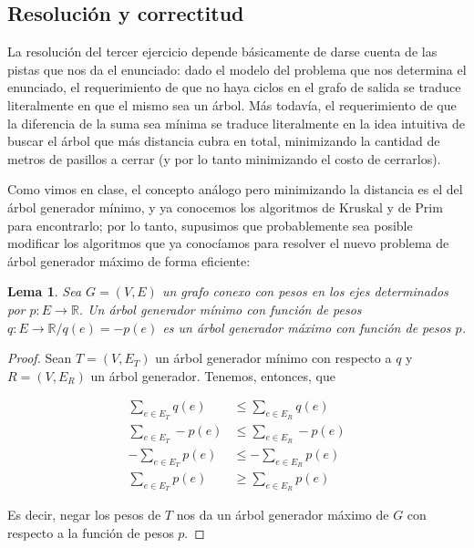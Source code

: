 \documentclass{article}
\newtheorem{lemma}{Lema}[theorem]
\theoremstyle{definition}
\theoremstyle{remark}
\begin{document}
\subsection{Resolución y correctitud}

La resolución del tercer ejercicio depende básicamente de darse cuenta de las pistas que nos da el enunciado: dado el modelo del problema que nos determina el enunciado, el requerimiento de que no haya ciclos en el grafo de salida se traduce literalmente en que el mismo sea un árbol. Más todavía, el requerimiento de que la diferencia de la suma sea mínima se traduce literalmente en la idea intuitiva de buscar el árbol que más distancia cubra en total, minimizando la cantidad de metros de pasillos a cerrar (y por lo tanto minimizando el costo de cerrarlos).

Como vimos en clase, el concepto análogo pero minimizando la distancia es el del árbol generador mínimo, y ya conocemos los algoritmos de Kruskal y de Prim para encontrarlo; por lo tanto, supusimos que probablemente sea posible modificar los algoritmos que ya conocíamos para resolver el nuevo problema de árbol generador máximo de forma eficiente:

\begin{lemma}
Sea $G = (V, E)$ un grafo conexo con pesos en los ejes determinados por $p : E \to \mathbb{R}$. Un árbol generador mínimo con función de pesos $q : E \to \mathbb{R} / q(e) = -p(e)$ es un árbol generador máximo con función de pesos $p$.
\label{pr:agm}
\end{lemma}

\begin{proof}
Sean $T = (V, E_T)$ un árbol generador mínimo con respecto a $q$ y $R = (V, E_R)$ un árbol generador. Tenemos, entonces, que

\begin{align*}
\sum_{e \in E_T} q(e) &\leq \sum_{e \in E_R} q(e)\\
\sum_{e \in E_T} -p(e) &\leq \sum_{e \in E_R} -p(e)\\
-\sum_{e \in E_T} p(e) &\leq -\sum_{e \in E_R} p(e)\\
\sum_{e \in E_T} p(e) &\geq \sum_{e \in E_R} p(e)
\end{align*}

Es decir, negar los pesos de $T$ nos da un árbol generador máximo de $G$ con respecto a la función de pesos $p$.
\end{proof}
\end{document}
